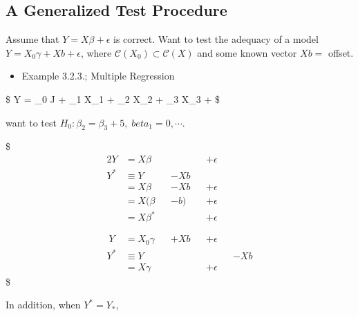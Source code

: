 \documentclass[
]{book}
\providecommand{\tightlist}{%
  \setlength{\itemsep}{0pt}\setlength{\parskip}{0pt}}
\begin{document}
{{{{\subsection{A Generalized Test Procedure}\label{a-generalized-test-procedure}}

Assume that \(Y = X \beta + \epsilon\) is correct. Want to test the adequacy of a model \(Y = X_0 \gamma + Xb + \epsilon\), where \(\mathcal{C}(X_0) \subset \mathcal{C}(X)\) and some known vector \(Xb=\) offset.

\begin{itemize}
\tightlist
\item
  Example 3.2.3.; Multiple Regression
\end{itemize}

\$
Y = \beta\_0 J + \beta\_1 X\_1 + \beta\_2 X\_2 + \beta\_3 X\_3 + \epsilon
\$

want to test \(H_0: \beta_2 = \beta_3+5, \; beta_1 = 0, \cdots\).

\$
\begin{alignat}{2}


Y &= X \beta && &&+ \epsilon \tag{FM}

\\

Y^\ast &\equiv Y && - X b &&

\\

&=X \beta && - Xb &&+ \epsilon

\\

&=X (\beta && - b) &&+ \epsilon


\\

&=X \beta^\ast && &&+ \epsilon \tag{FM}

\\
\\\
\\\


Y &= X_0 \gamma && + Xb &&+ \epsilon \tag{RM}

\\

Y^\ast &\equiv Y && && && - X b 

\\

&=X \gamma &&  &&+ \epsilon \tag{RM}




\end{alignat}
\$

In addition, when \(Y^\ast = Y_\ast\),

}}}
\end{document}
